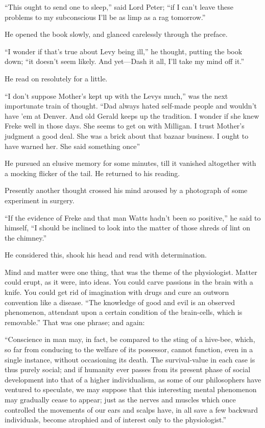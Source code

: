 \enquote{This ought to send one to sleep,} said Lord Peter; \enquote{if I can’t leave these problems to my subconscious I’ll be as limp as a rag tomorrow.}

He opened the book slowly, and glanced carelessly through the preface.

\enquote{I wonder if that’s true about Levy being ill,} he thought, putting the book down; \enquote{it doesn’t seem likely. And yet\allowbreak---\allowbreak Dash it all, I’ll take my mind off it.}

He read on resolutely for a little.

\enquote{I don’t suppose Mother’s kept up with the Levys much,} was the next importunate train of thought. \enquote{Dad always hated self-made people and wouldn’t have ’em at Denver. And old Gerald keeps up the tradition. I wonder if she knew Freke well in those days. She seems to get on with Milligan. I trust Mother’s judgment a good deal. She was a brick about that bazaar business. I ought to have warned her. She said something once\longdash}

He pursued an elusive memory for some minutes, till it vanished altogether with a mocking flicker of the tail. He returned to his reading.

Presently another thought crossed his mind aroused by a photograph of some experiment in surgery.

\enquote{If the evidence of Freke and that man Watts hadn’t been so positive,} he said to himself, \enquote{I should be inclined to look into the matter of those shreds of lint on the chimney.}

He considered this, shook his head and read with determination.

Mind and matter were one thing, that was the theme of the physiologist. Matter could erupt, as it were, into ideas. You could carve passions in the brain with a knife. You could get rid of imagination with drugs and cure an outworn convention like a disease. \enquote{The knowledge of good and evil is an observed phenomenon, attendant upon a certain condition of the brain-cells, which is removable.} That was one phrase; and again:

\enquote{Conscience in man may, in fact, be compared to the sting of a hive-bee, which, so far from conducing to the welfare of its possessor, cannot function, even in a single instance, without occasioning its death. The survival-value in each case is thus purely social; and if humanity ever passes from its present phase of social development into that of a higher individualism, as some of our philosophers have ventured to speculate, we may suppose that this interesting mental phenomenon may gradually cease to appear; just as the nerves and muscles which once controlled the movements of our ears and scalps have, in all save a few backward individuals, become atrophied and of interest only to the physiologist.}


